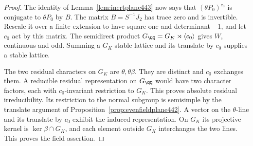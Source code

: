 \documentclass[a4paper,11pt]{article}
\theoremstyle{definition}
\theoremstyle{remark}
\numberwithin{equation}{section}
\begin{document}
\begin{proof}
The identity of Lemma~\ref{lem:inertplane443} now says that
\((\theta P_0)^{c_0}\) is conjugate to \(\theta P_0\) by \(B\).
The matrix \(B=S^{-1}J_2\) has trace zero and is invertible.
Rescale it over a finite extension to have square one and
determinant \(-1\), and let \(c_0\) act by this matrix. The
semidirect product \(G_\QQ=G_K\rtimes\langle c_0\rangle\)
gives \(W\), continuous and odd. Summing a \(G_K\)-stable
lattice and its translate by \(c_0\) supplies a stable lattice.

The two residual characters on \(G_K\) are \(\theta,\theta\beta\).
They are distinct and \(c_0\) exchanges them. A reducible residual
representation on \(G_\QQ\) would have two character factors,
each with \(c_0\)-invariant restriction to \(G_K\). This proves
absolute residual irreducibility. Its restriction to the normal
subgroup is semisimple by the translate argument of
Proposition~\ref{prop:evenfieldplane442}. A vector on the
\(\theta\)-line and its translate by \(c_0\) exhibit the induced
representation. On \(G_K\) its projective kernel is \(\ker\beta
\cap G_K\), and each element outside \(G_K\) interchanges the two
lines. This proves the field assertion.
\end{proof}
\end{document}

